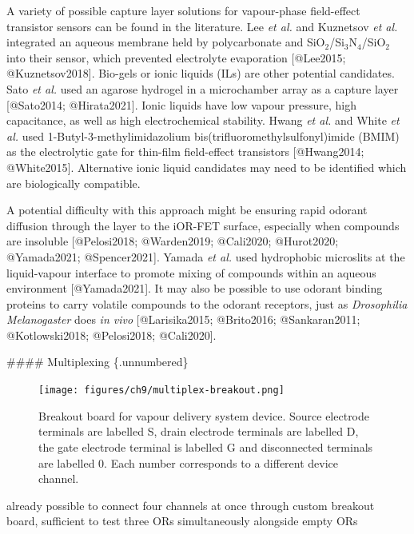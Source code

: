 \documentclass[
  letterpaper,
  DIV=11,
  numbers=noendperiod]{scrartcl}
\begin{document}
A variety of possible capture layer solutions for vapour-phase
field-effect transistor sensors can be found in the literature. Lee
\emph{et al.} and Kuznetsov \emph{et al.} integrated an aqueous membrane
held by polycarbonate and SiO\(_2\)/Si\(_3\)N\(_4\)/SiO\(_2\) into their
sensor, which prevented electrolyte evaporation {[}@Lee2015;
@Kuznetsov2018{]}. Bio-gels or ionic liquids (ILs) are other potential
candidates. Sato \emph{et al.} used an agarose hydrogel in a
microchamber array as a capture layer {[}@Sato2014; @Hirata2021{]}.
Ionic liquids have low vapour pressure, high capacitance, as well as
high electrochemical stability. Hwang \emph{et al.} and White \emph{et
al.} used 1-Butyl-3-methylimidazolium bis(trifluoromethylsulfonyl)imide
(BMIM) as the electrolytic gate for thin-film field-effect transistors
{[}@Hwang2014; @White2015{]}. Alternative ionic liquid candidates may
need to be identified which are biologically compatible.

A potential difficulty with this approach might be ensuring rapid
odorant diffusion through the layer to the iOR-FET surface, especially
when compounds are insoluble {[}@Pelosi2018; @Warden2019; @Cali2020;
@Hurot2020; @Yamada2021; @Spencer2021{]}. Yamada \emph{et al.} used
hydrophobic microslits at the liquid-vapour interface to promote mixing
of compounds within an aqueous environment {[}@Yamada2021{]}. It may
also be possible to use odorant binding proteins to carry volatile
compounds to the odorant receptors, just as \emph{Drosophilia
Melanogaster} does \emph{in vivo} {[}@Larisika2015; @Brito2016;
@Sankaran2011; @Kotlowski2018; @Pelosi2018; @Cali2020{]}.

\#\#\#\# Multiplexing \{.unnumbered\}

\begin{figure}

{\centering \texttt{[image: figures/ch9/multiplex-breakout.png]}

}

\caption{\label{fig-vapour-sensor-breakout}Breakout board for vapour
delivery system device. Source electrode terminals are labelled S, drain
electrode terminals are labelled D, the gate electrode terminal is
labelled G and disconnected terminals are labelled 0. Each number
corresponds to a different device channel.}

\end{figure}

already possible to connect four channels at once through custom
breakout board, sufficient to test three ORs simultaneously alongside
empty ORs
\end{document}
